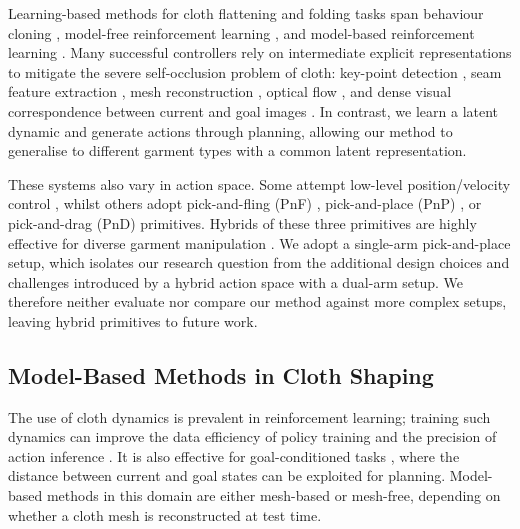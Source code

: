\documentclass[journal]{IEEEtran}
\newif\ifshowrev\showrevtrue
\newcommand{\rev}[1]{\ifshowrev\textcolor{revblue}{#1}\else#1\fi}
\newif\ifshowrrev\showrrevtrue
\newcommand{\rrev}[1]{\ifshowrrev\textcolor{rrevred}{#1}\else#1\fi}
\begin{document}
\rev{Learning-based methods for cloth flattening and folding tasks span \rrev{behaviour cloning \cite{lips2024learning, weng2022fabricflownet, mo2022foldsformer, huang2025sis, chi2023diffusionpolicy}, model-free reinforcement learning \cite{matas2018sim, lin2020softgym, lee2021learning, canberk2023cloth, gu2023learning, avigal2022speedfolding}, and model-based reinforcement learning \cite{yan2021learning, hoque2022visuospatial, ma2021learning, arnold2023cloth, lin2022learning, huang2022mesh}}. Many successful controllers rely on intermediate explicit representations to mitigate the severe self-occlusion problem of cloth: key-point detection \cite{lips2024learning}, seam feature extraction \cite{huang2025sis}, mesh reconstruction \cite{huang2022mesh}, optical flow \cite{weng2022fabricflownet}, and dense visual correspondence between current and goal images \cite{wu2024unigarmentmanip}. In contrast, we learn a latent dynamic and generate actions through planning, allowing our method to generalise to different garment types with a common latent representation.}

\rev{These systems also vary in action space. Some attempt low-level position/velocity control \cite{matas2018sim, lin2020softgym}, whilst others adopt pick-and-fling (PnF) \cite{doumanoglou2014autonomous}, pick-and-place (PnP) \cite{sun2015accurate}, or pick-and-drag (PnD) \cite{he2024fabricfolding} primitives. Hybrids of these three primitives are highly effective for diverse garment manipulation \cite{avigal2022speedfolding, canberk2023cloth}. We adopt a single-arm pick-and-place setup, which isolates our research question from the additional design choices and challenges introduced by a hybrid action space with a dual-arm setup. We therefore neither evaluate nor compare our method against more complex setups, leaving hybrid primitives to future work.}

\subsection{Model-Based Methods in Cloth Shaping} \label{sec:mbrl}

\rev{The use of cloth dynamics is prevalent in reinforcement learning; training such dynamics can improve the data efficiency of policy training and the precision of action inference \cite{hafner2019learning, kadi2024planet, lin2022learning}. It is also effective for goal-conditioned tasks \cite{duan2024learning, hoque2022visuospatial}, where the distance between current and goal states can be exploited for planning. Model-based methods in this domain are either mesh-based or mesh-free, depending on whether a cloth mesh is reconstructed at test time.}
\end{document}
